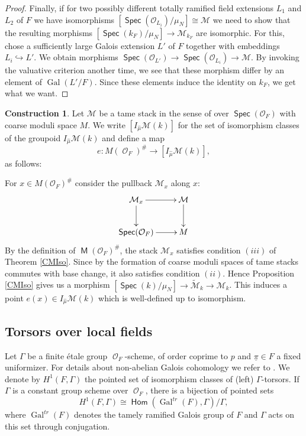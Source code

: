 \documentclass{article}
\DeclareMathOperator{\Hom}{\mathsf{Hom}}
\DeclareMathOperator{\Gal}{Gal}
\DeclareMathOperator{\M}{\mathsf{M}}
\newcommand{\Mc}{\mathcal{M}}
\DeclareMathOperator{\Spec}{\mathsf{Spec}}
\DeclareMathOperator{\Oo}{\mathcal{O}}
\newcommand{\CM}{{\mathcal M}}
\newcommand{\CO}{{\mathcal O}}
\let\into\hookrightarrow
\theoremstyle{definition}
\newtheorem{construction}[definition]{Construction}
\theoremstyle{plain}
\begin{document}
\begin{proof}
Finally, if for two possibly different totally ramified field extensions $L_1$ and $L_2$ of $F$ we have isomorphisms $[\Spec(\CO_{L_i})/\mu_N]\cong \CM$ we need to show that the resulting morphisms $[\Spec(k_F)/\mu_N] \to \CM_{k_F}$ are isomorphic. For this, chose a sufficiently large Galois extension $L'$ of $F$ together with embeddings $L_i \into L'$. We obtain morphisms $\Spec(\CO_{L'}) \to \Spec(\CO_{L_i}) \to \CM$. By invoking the valuative criterion another time, we see that these morphism differ by an element of $\Gal(L'/F)$. Since these elements induce the identity on $k_F$, we get what we want.
\end{proof}

\begin{construction}\label{defi:e} 
Let $\CM$ be a tame stack in the sense of \cite{MR2427954} over $\Spec(\CO_F)$ with coarse moduli space $M$. We write $[I_{\widehat{\mu}}\Mc(k)]$ for the set of isomorphism classes of the groupoid $I_{\widehat{\mu}}\Mc(k)$ and define a map
\[e: M(\Oo_F)^\# \to [I_{\widehat{\mu}}\Mc(k)],  \]
as follows: 

For $x \in M(\CO_F)^\#$ consider the pullback $\CM_x$ along $x$:
\begin{equation*}
  \xymatrix{
    \CM_x \ar[r] \ar[d] & \CM \ar[d] \\
    \Spec(\CO_F) \ar[r] & M
}
\end{equation*}
By the definition of $\M(\CO_F)^\#$, the stack $\CM_x$ satisfies condition $(iii)$ of Theorem \ref{CMIso}. Since by \cite[3.3]{MR2427954} the formation of coarse moduli spaces of tame stacks commutes with base change, it also satisfies condition $(ii)$. Hence Proposition \ref{CMIso} gives us a morphism $[\Spec(k)/\mu_N] \to \widetilde \CM_{k} \to\CM_{k}$. This induces a point $e(x) \in I_{\widehat \mu}\CM(k)$ which is well-defined up to isomorphism.
\end{construction}

\subsection{Torsors over local fields}\label{sub:torsors}

Let $\Gamma$ be a finite \'etale group $\Oo_F$-scheme, of order coprime to $p$ and $\underline{\pi} \in F$ a fixed uniformizer.
For details about non-abelian Galois cohomology we refer to \cite[Section I.5]{Se07}. We denote by $H^1(F,\Gamma)$ the pointed set of isomorphism classes of (left) $\Gamma$-torsors. If $\Gamma$ is a constant group scheme over $\Oo_F$, there is a bijection of pointed sets
\[ H^1(F,\Gamma) \cong \Hom( \Gal^{tr}(F),\Gamma)/\Gamma,  \]
where $ \Gal^{tr}(F)$ denotes the tamely ramified Galois group of $F$ and $\Gamma$ acts on this set through conjugation.
 
\end{document}
